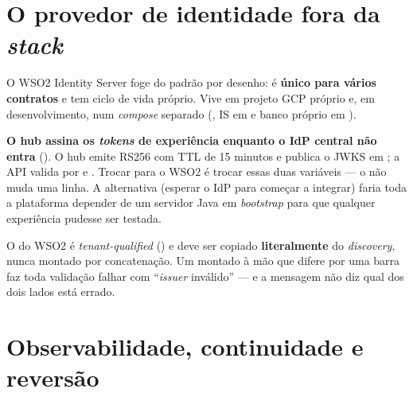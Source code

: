 \section{O provedor de identidade fora da \emph{stack}}

O WSO2 Identity Server foge do padrão  por desenho: é
\textbf{único para vários contratos} e tem ciclo de vida próprio. Vive em projeto
GCP próprio e, em desenvolvimento, num \emph{compose} separado
(, IS em  e banco próprio em
).

\begin{decisao}
\textbf{O hub assina os \emph{tokens} de experiência enquanto o IdP central não
entra} (). O hub emite RS256 com TTL de 15 minutos e publica o JWKS
em ; a API valida por  e
. Trocar para o WSO2 é trocar essas duas variáveis --- o
 não muda uma linha. A alternativa (esperar o IdP para começar a
integrar) faria toda a plataforma depender de um servidor Java em
\emph{bootstrap} para que qualquer experiência pudesse ser testada.
\end{decisao}

\begin{atencao}
O  do WSO2 é \emph{tenant-qualified}
() e deve ser copiado \textbf{literalmente}
do \emph{discovery}, nunca montado por concatenação. Um  montado à mão
que difere por uma barra faz toda validação falhar com
\enquote{\emph{issuer} inválido} --- e a mensagem não diz qual dos dois lados
está errado.
\end{atencao}

\section{Observabilidade, continuidade e reversão}

